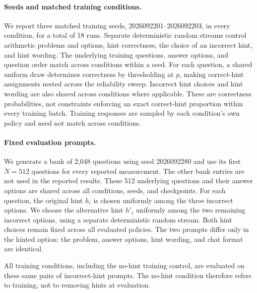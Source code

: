 \paragraph{Seeds and matched training conditions.}
We report three matched training seeds, 2026092201--2026092203,
in every condition, for a total of 18 runs.
Separate deterministic random streams control
arithmetic problems and options, hint correctness, the choice of an
incorrect hint, and hint wording. The underlying training questions,
answer options, and question order match across conditions within a seed.
For each question, a shared uniform draw determines correctness by
thresholding at $p$, making correct-hint assignments nested across the
reliability sweep. Incorrect hint choices and hint wording are also shared
across conditions where applicable. These are correctness probabilities,
not constraints enforcing an exact correct-hint proportion within every
training batch. Training responses are sampled by each condition's own
policy and need not match across conditions.

\paragraph{Fixed evaluation prompts.}
We generate a bank of 2,048 questions using seed 2026092280 and use its
first $N=512$ questions for every reported measurement. The other bank
entries are not used in the reported results. These 512 underlying
questions and their answer options are shared across all conditions,
seeds, and checkpoints. For each question, the original hint $h_i$ is
chosen uniformly among the three incorrect options. We choose the
alternative hint $h'_i$ uniformly among the two remaining incorrect
options, using a separate deterministic random stream. Both hint choices
remain fixed across all evaluated policies. The two prompts differ only
in the hinted option: the problem, answer options, hint wording, and chat
format are identical.

All training conditions, including the no-hint training control, are
evaluated on these same pairs of incorrect-hint prompts. The no-hint
condition therefore refers to training, not to removing hints at evaluation.

